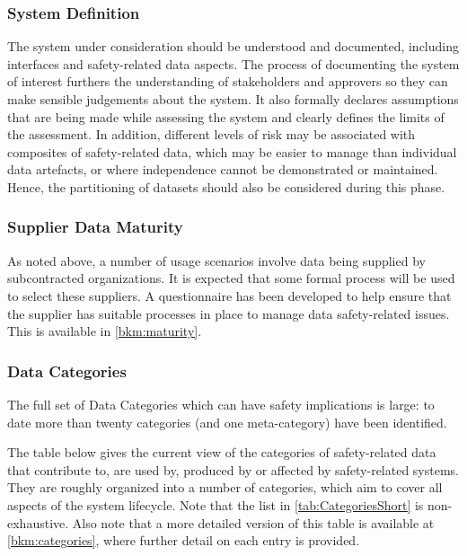 \subsubsection{System Definition}
The system under consideration should be understood and documented, including interfaces and safety-related data aspects. The process of documenting the system of interest furthers the understanding of \glspl{stakeholder} and approvers so they can make sensible judgements about the system. It also formally declares assumptions that are being made while assessing the system and clearly defines the limits of the assessment. In addition, different levels of risk may be associated with composites of safety-related data, which may be easier to manage than individual \cbstart\glspl{data artefact}\cbend, or where independence cannot be demonstrated or maintained. Hence, the partitioning of \glspl{dataset} should also be considered during this phase.

\subsubsection{Supplier Data Maturity}
As noted above, a number of usage scenarios involve data being supplied by subcontracted organizations. It is expected that some formal process will be used to select these suppliers. A questionnaire has been developed to help ensure that the supplier has suitable processes in place to manage data safety-related issues. This is available in \autoref{bkm:maturity}.

\subsubsection{Data Categories}
\label{bkm:datacategories}
The full set of Data Categories which can have safety implications is large: to date more than twenty categories (and one meta-category) have been identified. 

The table below gives the current view of the categories of safety-related data that contribute to, are used by, produced by or affected by safety-related systems. They are roughly organized into a number of categories, which aim to cover all aspects of the system lifecycle. Note that the list in \autoref{tab:CategoriesShort} is non-exhaustive. Also note that a more detailed version of this table is available at \autoref{bkm:categories},
where further detail on each entry is provided.

